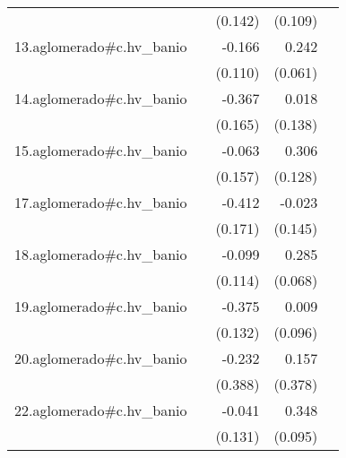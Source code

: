 {\begin{longtable}{l*{4}{D{.}{.}{-1}}}
            &                     &     (0.142)         &     (0.109)         &                     \\
\addlinespace
13.aglomerado#c.hv\_banio&                     &      -0.166         &       0.242\sym{***}&                     \\
            &                     &     (0.110)         &     (0.061)         &                     \\
\addlinespace
14.aglomerado#c.hv\_banio&                     &      -0.367\sym{*}  &       0.018         &                     \\
            &                     &     (0.165)         &     (0.138)         &                     \\
\addlinespace
15.aglomerado#c.hv\_banio&                     &      -0.063         &       0.306\sym{*}  &                     \\
            &                     &     (0.157)         &     (0.128)         &                     \\
\addlinespace
17.aglomerado#c.hv\_banio&                     &      -0.412\sym{*}  &      -0.023         &                     \\
            &                     &     (0.171)         &     (0.145)         &                     \\
\addlinespace
18.aglomerado#c.hv\_banio&                     &      -0.099         &       0.285\sym{***}&                     \\
            &                     &     (0.114)         &     (0.068)         &                     \\
\addlinespace
19.aglomerado#c.hv\_banio&                     &      -0.375\sym{**} &       0.009         &                     \\
            &                     &     (0.132)         &     (0.096)         &                     \\
\addlinespace
20.aglomerado#c.hv\_banio&                     &      -0.232         &       0.157         &                     \\
            &                     &     (0.388)         &     (0.378)         &                     \\
\addlinespace
22.aglomerado#c.hv\_banio&                     &      -0.041         &       0.348\sym{***}&                     \\
            &                     &     (0.131)         &     (0.095)         &                     \\

\end{longtable}}
